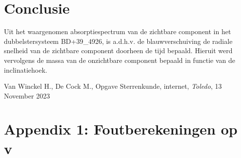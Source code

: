 \documentclass[12pt]{article}
\begin{document}
\section{Conclusie}
Uit het waargenomen absorptiespectrum van de zichtbare component in het dubbelstersysteem BD+39\_4926, is a.d.h.v. de blauwverschuiving de radiale snelheid van de zichtbare component doorheen de tijd bepaald. Hieruit werd vervolgens de massa van de onzichtbare component bepaald in functie van de inclinatiehoek.
	
	

	\begin{thebibliography}{9}
		  Van Winckel H., De Cock M., Opgave Sterrenkunde, internet, \textit{Toledo}, 13 November 2023
	\end{thebibliography}
\pagebreak

\section{Appendix 1: Foutberekeningen op v}
\end{document}
